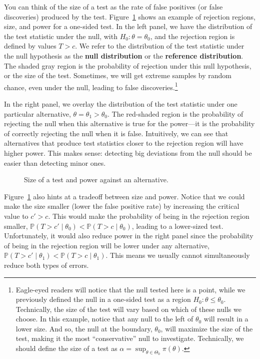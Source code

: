 \documentclass[
  13pt,
  letterpaper,
  DIV=11,
  numbers=noendperiod]{scrreprt}
\renewcommand{\P}{\mathbb{P}}
\theoremstyle{plain}
\theoremstyle{definition}
\theoremstyle{definition}
\theoremstyle{remark}
\begin{document}
You can think of the size of a test as the rate of false positives (or
false discoveries) produced by the test. Figure~\ref{fig-size-power}
shows an example of rejection regions, size, and power for a one-sided
test. In the left panel, we have the distribution of the test statistic
under the null, with \(H_0: \theta = \theta_0\), and the rejection
region is defined by values \(T > c\). We refer to the distribution of
the test statistic under the null hypothesis as the \textbf{null
distribution} or the \textbf{reference distribution}. The shaded gray
region is the probability of rejection under this null hypothesis, or
the size of the test. Sometimes, we will get extreme samples by random
chance, even under the null, leading to false discoveries.\footnote{Eagle-eyed
  readers will notice that the null tested here is a point, while we
  previously defined the null in a one-sided test as a region
  \(H_0: \theta \leq \theta_0\). Technically, the size of the test will
  vary based on which of these nulls we choose. In this example, notice
  that any null to the left of \(\theta_0\) will result in a lower size.
  And so, the null at the boundary, \(\theta_0\), will maximize the size
  of the test, making it the most ``conservative'' null to investigate.
  Technically, we should define the size of a test as
  \(\alpha = \sup_{\theta \in \Theta_0} \pi(\theta)\).}

In the right panel, we overlay the distribution of the test statistic
under one particular alternative, \(\theta = \theta_1 > \theta_0\). The
red-shaded region is the probability of rejecting the null when this
alternative is true for the power---it is the probability of correctly
rejecting the null when it is false. Intuitively, we can see that
alternatives that produce test statistics closer to the rejection region
will have higher power. This makes sense: detecting big deviations from
the null should be easier than detecting minor ones.

\begin{figure}[th]


\caption{\label{fig-size-power}Size of a test and power against an
alternative.}

\end{figure}%

Figure~\ref{fig-size-power} also hints at a tradeoff between size and
power. Notice that we could make the size smaller (lower the false
positive rate) by increasing the critical value to \(c' > c\). This
would make the probability of being in the rejection region smaller,
\(\P(T > c' \mid \theta_0) < \P(T > c \mid \theta_0)\), leading to a
lower-sized test. Unfortunately, it would also reduce power in the right
panel since the probability of being in the rejection region will be
lower under any alternative,
\(\P(T > c' \mid \theta_1) < \P(T > c \mid \theta_1)\). This means we
usually cannot simultaneously reduce both types of errors.
\end{document}
